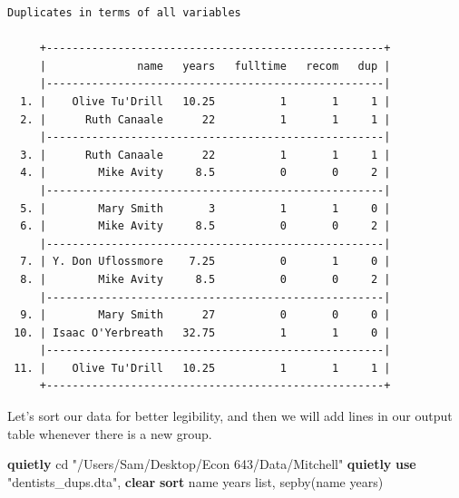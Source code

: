 \documentclass[
]{book}
\newenvironment{Shaded}{\begin{snugshade}}{\end{snugshade}}
\newcommand{\BaseNTok}[1]{\textcolor[rgb]{0.00,0.00,0.81}{#1}}
\newcommand{\KeywordTok}[1]{\textcolor[rgb]{0.13,0.29,0.53}{\textbf{#1}}}
\newcommand{\NormalTok}[1]{#1}
\newcommand{\OtherTok}[1]{\textcolor[rgb]{0.56,0.35,0.01}{#1}}
\newcommand{\StringTok}[1]{\textcolor[rgb]{0.31,0.60,0.02}{#1}}
\begin{document}
\begin{verbatim}
Duplicates in terms of all variables

     +----------------------------------------------------+
     |              name   years   fulltime   recom   dup |
     |----------------------------------------------------|
  1. |    Olive Tu'Drill   10.25          1       1     1 |
  2. |      Ruth Canaale      22          1       1     1 |
     |----------------------------------------------------|
  3. |      Ruth Canaale      22          1       1     1 |
  4. |        Mike Avity     8.5          0       0     2 |
     |----------------------------------------------------|
  5. |        Mary Smith       3          1       1     0 |
  6. |        Mike Avity     8.5          0       0     2 |
     |----------------------------------------------------|
  7. | Y. Don Uflossmore    7.25          0       1     0 |
  8. |        Mike Avity     8.5          0       0     2 |
     |----------------------------------------------------|
  9. |        Mary Smith      27          0       0     0 |
 10. | Isaac O'Yerbreath   32.75          1       1     0 |
     |----------------------------------------------------|
 11. |    Olive Tu'Drill   10.25          1       1     1 |
     +----------------------------------------------------+
\end{verbatim}

Let's sort our data for better legibility, and then we will add lines in our output table whenever there is a new group.

\begin{Shaded}
\begin{Highlighting}[]
\KeywordTok{quietly}\NormalTok{ cd }\StringTok{"/Users/Sam/Desktop/Econ 643/Data/Mitchell"}
\KeywordTok{quietly} \KeywordTok{use} \StringTok{"dentists\_dups.dta"}\NormalTok{, }\KeywordTok{clear}
\KeywordTok{sort} \BaseNTok{name}\NormalTok{ years}
\OtherTok{list}\NormalTok{, sepby(}\BaseNTok{name}\NormalTok{ years)}
\end{Highlighting}
\end{Shaded}
\end{document}
